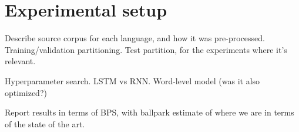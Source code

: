 \section{Experimental setup}
\label{sec:setup}

Describe source corpus for each language, and how it was
pre-processed. Training/validation partitioning. Test partition, for
the experiments where it's relevant.

Hyperparameter search. LSTM vs RNN. Word-level model (was it also
optimized?)

Report results in terms of BPS, with ballpark estimate of where we are
in terms of the state of the art.

